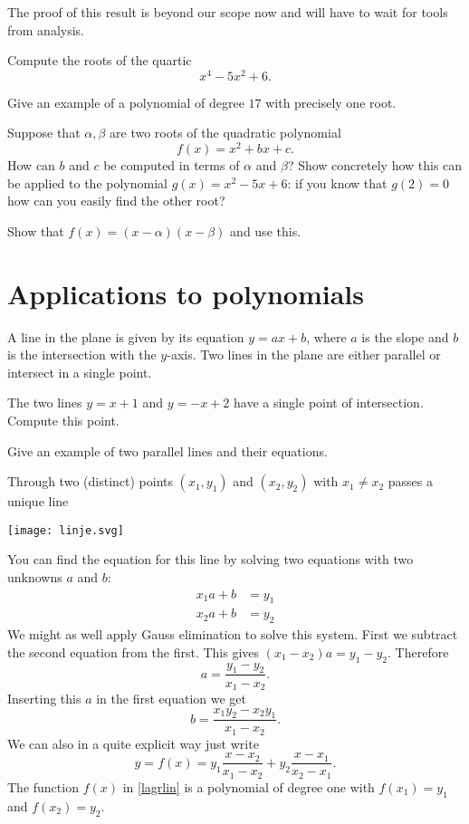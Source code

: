 \documentclass{article}
\begin{document}
The proof of this result is beyond our scope now and will have to wait for tools from analysis.

\beginshex
Compute the roots of the quartic
$$
x^4 - 5x^2 + 6.
$$
\endshex

\beginshex
Give an example of a polynomial of degree $17$ with precisely one root.
\endshex

\beginshex
Suppose that $\alpha, \beta$ are two roots of the quadratic polynomial
$$
f(x) = x^2 + b x + c.
$$
How can $b$ and $c$ be computed in terms of $\alpha$ and $\beta$?
Show concretely how this can be applied to the polynomial
$g(x) = x^2 - 5 x + 6$: if you know that $g(2) = 0$ how can you easily
find the other root?

\begin{hint}
Show that $f(x) = (x-\alpha)(x-\beta)$ and use this.  
\end{hint}
\endshex


\section{Applications to polynomials}


A line in the plane is given by its equation $y = a x + b$, where $a$ is the slope 
and $b$ is the intersection with the $y$-axis. Two lines in the plane
are either parallel or intersect in a single point.

\beginshex
The two lines $y = x+1$ and $y=-x+2$ have a single point
of intersection. Compute this point.

Give an example of two parallel lines and their equations.
\endshex

Through two (distinct) points $(x_1, y_1)$ and $(x_2, y_2)$ with $x_1\neq x_2$ passes a unique line 

  \texttt{[image: linje.svg]}

You can find the equation for this line by solving
two equations with two unknowns $a$ and $b$:
\begin{align*}
x_1 a + b &= y_1\\
x_2 a + b &= y_2
\end{align*}
We might as well apply Gauss elimination to solve this system. First we
subtract the second equation from the first. This gives
$(x_1 - x_2) a = y_1 - y_2$. Therefore
$$
a = \frac{y_1 - y_2}{x_1 - x_2}.
$$
Inserting this $a$ in the first equation we get
$$
b = \frac{x_1 y_2 -x_2 y_1}{x_1 - x_2}.
$$
We can also in a quite explicit way just write
\begin{equation}\label{lagrlin}
y = f(x) = y_1 \frac{x - x_2}{x_1 - x_2} + y_2 \frac{x - x_1}{x_2 - x_1}.
\end{equation}
The function $f(x)$ in 
\eqref{lagrlin} is a polynomial of degree one with
$f(x_1) = y_1$ and $f(x_2) = y_2$.
\end{document}

